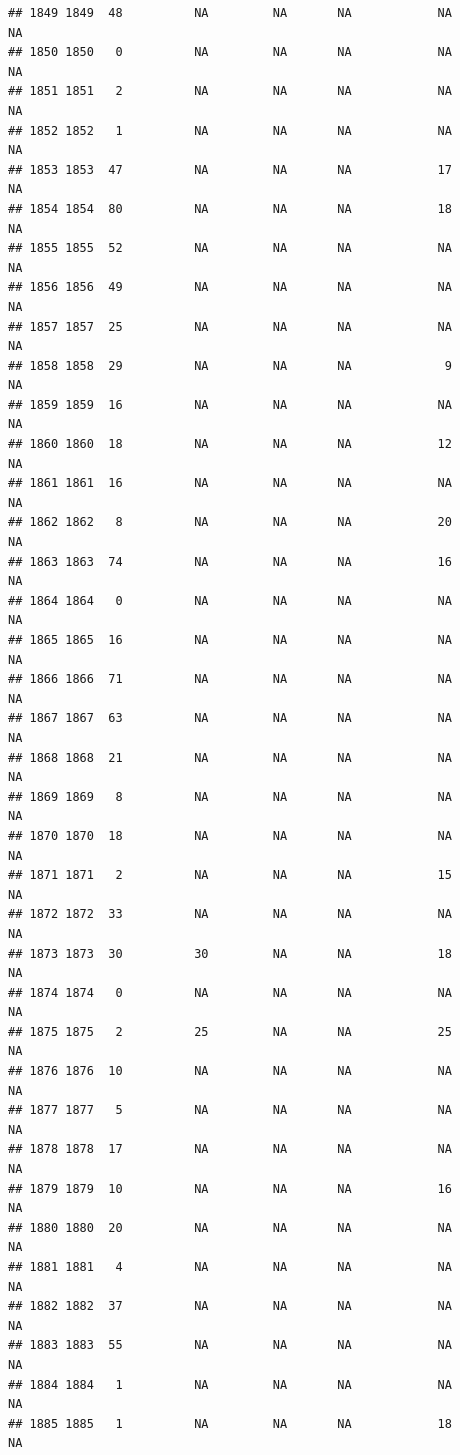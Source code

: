 \documentclass[man]{apa6}
\begin{document}
\begin{verbatim}
## 1849 1849  48          NA         NA       NA            NA       NA
## 1850 1850   0          NA         NA       NA            NA       NA
## 1851 1851   2          NA         NA       NA            NA       NA
## 1852 1852   1          NA         NA       NA            NA       NA
## 1853 1853  47          NA         NA       NA            17       NA
## 1854 1854  80          NA         NA       NA            18       NA
## 1855 1855  52          NA         NA       NA            NA       NA
## 1856 1856  49          NA         NA       NA            NA       NA
## 1857 1857  25          NA         NA       NA            NA       NA
## 1858 1858  29          NA         NA       NA             9       NA
## 1859 1859  16          NA         NA       NA            NA       NA
## 1860 1860  18          NA         NA       NA            12       NA
## 1861 1861  16          NA         NA       NA            NA       NA
## 1862 1862   8          NA         NA       NA            20       NA
## 1863 1863  74          NA         NA       NA            16       NA
## 1864 1864   0          NA         NA       NA            NA       NA
## 1865 1865  16          NA         NA       NA            NA       NA
## 1866 1866  71          NA         NA       NA            NA       NA
## 1867 1867  63          NA         NA       NA            NA       NA
## 1868 1868  21          NA         NA       NA            NA       NA
## 1869 1869   8          NA         NA       NA            NA       NA
## 1870 1870  18          NA         NA       NA            NA       NA
## 1871 1871   2          NA         NA       NA            15       NA
## 1872 1872  33          NA         NA       NA            NA       NA
## 1873 1873  30          30         NA       NA            18       NA
## 1874 1874   0          NA         NA       NA            NA       NA
## 1875 1875   2          25         NA       NA            25       NA
## 1876 1876  10          NA         NA       NA            NA       NA
## 1877 1877   5          NA         NA       NA            NA       NA
## 1878 1878  17          NA         NA       NA            NA       NA
## 1879 1879  10          NA         NA       NA            16       NA
## 1880 1880  20          NA         NA       NA            NA       NA
## 1881 1881   4          NA         NA       NA            NA       NA
## 1882 1882  37          NA         NA       NA            NA       NA
## 1883 1883  55          NA         NA       NA            NA       NA
## 1884 1884   1          NA         NA       NA            NA       NA
## 1885 1885   1          NA         NA       NA            18       NA

\end{verbatim}
\end{document}
